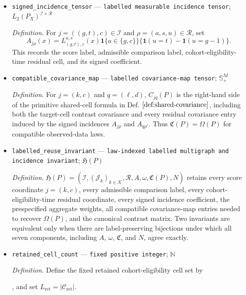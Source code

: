 \documentclass{article}
\begin{document}
\begin{itemize}
  \item \texttt{signed\_\allowbreak{}incidence\_\allowbreak{}tensor} --- \texttt{labelled measurable incidence tensor}; \(L_2(P_X)^{\mathcal I\times\mathcal R}\)
  \par\smallskip\noindent\emph{Definition.} For \(j=((g,t),c)\in\mathcal I\) and \(\rho=(a,s,u)\in\mathcal R\), set \[A_{j\rho}(x)=L_{(g,t),c}^{a,s}(x)\mathbf 1\{a\in\{g,c\}\}\{\mathbf 1(u=t)-\mathbf 1(u=g-1)\}.\] This records the score label, admissible comparison label, cohort-eligibility-time residual cell, and its signed coefficient.
  \item \texttt{compatible\_\allowbreak{}covariance\_\allowbreak{}map} --- \texttt{labelled covariance-\allowbreak{}map tensor}; \(\mathbb S_+^M\)
  \par\smallskip\noindent\emph{Definition.} For \(j=(k,c)\) and \(q=(\ell,d)\), \(C_{jq}(P)\) is the right-hand side of the primitive shared-cell formula in \(\mathrm{Def.}\) \(\ref{def:shared-covariance}\), including both the target-cell contrast covariance and every residual covariance entry induced by the signed incidences \(A_{j\rho}\) and \(A_{q\rho'}\). Thus \(\mathfrak C(P)=\Omega(P)\) for compatible observed-data laws.
  \item \texttt{labelled\_\allowbreak{}reuse\_\allowbreak{}invariant} --- \texttt{law-\allowbreak{}indexed labelled multigraph and incidence invariant}; \(\mathfrak H(P)\)
  \par\smallskip\noindent\emph{Definition.} \(\mathfrak H(P)=(\mathcal I,(\mathcal J_k)_{k\in\mathcal K},\mathcal R,A,\omega,\mathfrak C(P),N)\) retains every score coordinate \(j=(k,c)\), every admissible comparison label, every cohort-eligibility-time residual coordinate, every signed incidence coefficient, the prespecified aggregate weights, all compatible covariance-map entries needed to recover \(\Omega(P)\), and the canonical contrast matrix. Two invariants are equivalent only when there are label-preserving bijections under which all seven components, including \(A\), \(\omega\), \(\mathfrak C\), and \(N\), agree exactly.
  \item \texttt{retained\_\allowbreak{}cell\_\allowbreak{}count} --- \texttt{fixed positive integer}; \(\mathbb N\)
  \par\smallskip\noindent\emph{Definition.} Define the fixed retained cohort-eligibility cell set by \leavevmode\par\noindent {}\par\noindent, and set \(L_{\mathrm{ret}}=|\mathcal C_{\mathrm{ret}}|\).

\end{itemize}
\end{document}
